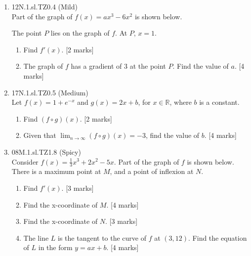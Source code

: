 \documentclass[12pt, twoside]{article}
\begin{document}
\begin{enumerate}
  \item 12N.1.sl.TZ0.4 (Mild)\\
  Part of the graph of $f(x)= ax^3-6x^2$ is shown below.
    \begin{center}
    \end{center}
    The point $P$ lies on the graph of $f$. At $P$, $x=1$.
    \begin{enumerate}
      \item Find $f'(x)$. [2 marks]
      \item The graph of $f$ has a gradient of 3 at the point $P$. Find the value of $a$. [4 marks]
    \end{enumerate}

    \item 17N.1.sl.TZ0.5 (Medium)\\
    Let $f(x)=1+e^{-x}$ and $g(x)=2x+b$, for $x \in \mathbb{R}$, where $b$ is a constant.
    \begin{enumerate}
      \item Find $(f \circ g)(x)$. [2 marks]
      \item Given that $\displaystyle \lim_{n \rightarrow \infty} (f \circ g)(x) = -3$, find the value of $b$. [4 marks]
    \end{enumerate}

\newpage
    \item 08M.1.sl.TZ1.8 (Spicy)\\
    Consider $f(x)= \frac{1}{3} x^3+2x^2-5x$. Part of the graph of $f$ is shown below. There is a maximum point at $M$, and a point of inflexion at $N$.
      \begin{center}
      \end{center}
      \begin{enumerate}
        \item Find $f'(x)$. [3 marks]
        \item Find the x-coordinate of $M$. [4 marks]
        \item Find the x-coordinate of $N$. [3 marks]
        \item The line $L$ is the tangent to the curve of $f$ at $(3,12)$. Find the equation of $L$ in the form $y=ax+b$. [4 marks]
      \end{enumerate}


\end{enumerate}
\end{document}
